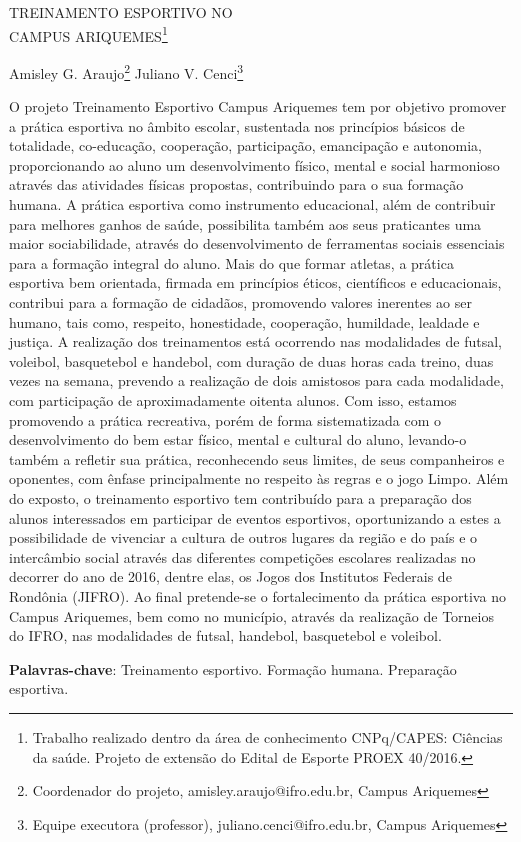 \documentclass[article,12pt,onesidea,4paper,english,brazil]{abntex2}
\begin{document}
	
	
	\frenchspacing 
	
	\begin{center}
		\LARGE TREINAMENTO ESPORTIVO NO\\CAMPUS ARIQUEMES\footnote{Trabalho realizado dentro da área de conhecimento CNPq/CAPES: Ciências da saúde. Projeto de extensão do Edital de Esporte PROEX 40/2016.}
		
		\normalsize
		Amisley G. Araujo\footnote{Coordenador do projeto, amisley.araujo@ifro.edu.br, Campus Ariquemes} 
		Juliano V. Cenci\footnote{Equipe executora (professor), juliano.cenci@ifro.edu.br, Campus Ariquemes} 
		 
	\end{center}
	
	\noindent O projeto Treinamento Esportivo Campus Ariquemes tem por objetivo promover a prática esportiva no âmbito escolar, sustentada nos princípios básicos de totalidade, co-educação, cooperação, participação, emancipação e autonomia, proporcionando ao aluno um desenvolvimento físico, mental e social harmonioso através das atividades físicas propostas, contribuindo para o sua formação humana. A prática esportiva como instrumento educacional, além de contribuir para melhores ganhos de saúde, possibilita também aos seus praticantes uma maior sociabilidade, através do desenvolvimento de ferramentas sociais essenciais para a formação integral do aluno. Mais do que formar atletas, a prática esportiva bem orientada, firmada em princípios éticos, científicos e educacionais, contribui para a formação de cidadãos, promovendo valores inerentes ao ser humano, tais como, respeito, honestidade, cooperação, humildade, lealdade e justiça. A realização dos treinamentos está ocorrendo nas modalidades de futsal, voleibol, basquetebol e handebol, com duração de duas horas cada treino, duas vezes na semana, prevendo a realização de dois amistosos para cada modalidade, com participação de aproximadamente oitenta alunos. Com isso, estamos promovendo a prática recreativa, porém de forma sistematizada com o desenvolvimento do bem estar físico, mental e cultural do aluno, levando-o também a refletir sua prática, reconhecendo seus limites, de seus companheiros e oponentes, com ênfase principalmente no respeito às regras e o jogo Limpo. Além do exposto, o treinamento esportivo tem contribuído para a preparação dos alunos interessados em participar de eventos esportivos, oportunizando a estes a possibilidade de vivenciar a cultura de outros lugares da região e do país e o intercâmbio social através das diferentes competições escolares realizadas no decorrer do ano de 2016, dentre elas, os Jogos dos Institutos Federais de Rondônia (JIFRO). Ao final pretende-se o fortalecimento da prática esportiva no Campus Ariquemes, bem como no município, através da realização de Torneios do IFRO, nas modalidades de futsal, handebol, basquetebol e voleibol.
	
	\vspace{\onelineskip}
	
	\noindent
	\textbf{Palavras-chave}: Treinamento esportivo. Formação humana. Preparação esportiva.
	
\end{document}
